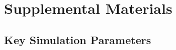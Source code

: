 \documentclass[letterpaper]{article}
\begin{document}

\appendix
\onecolumn
\section{Supplemental Materials}
\subsection{Key Simulation Parameters}
\setcounter{page}{0}

\end{document}
